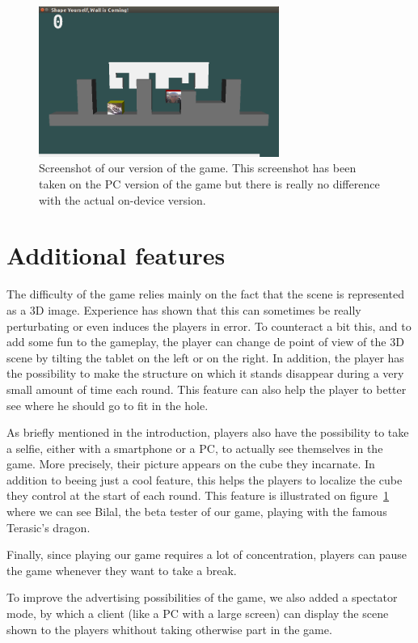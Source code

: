 \documentclass[english, DIV=13]{scrreprt}
\begin{document}
\begin{figure}[bth]
    \centering
    \includegraphics[width=0.7\textwidth]{img/custom-game-version}
    \caption{Screenshot of our version of the game. This screenshot has been taken
    on the PC version of the game but there is really no difference with the actual
    on-device version.}
    \label{fig:custom-game}
\end{figure}

\section{Additional features}
The difficulty of the game relies mainly on the fact that the scene is represented as a
3D image. Experience has shown that this can sometimes be really perturbating or even
induces the players in error. To counteract a bit this, and to add some fun to the
gameplay, the player can change de point of view of the 3D scene by tilting the tablet
on the left or on the right. In addition, the player has the possibility to make the
structure on which it stands disappear during a very small amount of time each round.
This feature can also help the player to better see where he should go to fit in the hole.

As briefly mentioned in the introduction, players also have the possibility to take a
selfie, either with a smartphone or a PC, to actually see themselves in the game. More
precisely, their picture appears on the cube they incarnate. In addition to beeing just a
cool feature, this helps the players to localize the cube they control at the start of
each round. This feature is illustrated on figure~\ref{fig:custom-game} where we can
see Bilal, the beta tester of our game, playing with the famous Terasic's dragon.

Finally, since playing our game requires a lot of concentration, players can pause the
game whenever they want to take a break.

To improve the advertising possibilities of the game, we also added a spectator mode,
by which a client (like a PC with a large screen) can display the scene shown to the
players whithout taking otherwise part in the game.
\end{document}
